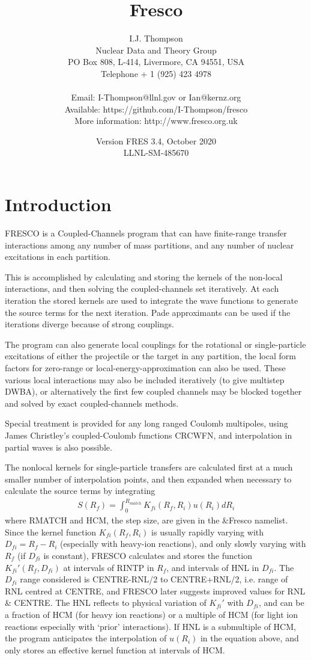 \documentclass[11pt]{article}
\title{\Huge Fresco}
\date{Version FRES 3.4, October 2020\\  LLNL-SM-485670}
\author{I.J. Thompson
%
\\Nuclear Data and Theory Group
\\PO Box 808, L-414,
 Livermore, CA 94551, USA
\\Telephone + 1 (925) 423 4978
\\ %
\\Email: I-Thompson@llnl.gov or Ian@kernz.org
\\Available: https://github.com/I-Thompson/fresco
\\More information: http://www.fresco.org.uk }
\newcommand{\beqn}{\begin{eqnarray}}
\newcommand{\eeqn}{\end{eqnarray}}
\begin{document}
\maketitle
\tableofcontents
\newpage
\section{Introduction}

\parskip 5pt
\parindent 10pt

FRESCO is a Coupled-Channels program that can have finite-range
transfer interactions among any number of mass partitions, and any
number of nuclear excitations in each partition.

This is accomplished by calculating and storing the kernels of the
non-local interactions, and then solving the coupled-channels set
iteratively.
At each iteration the stored kernels are used to integrate the wave
functions to generate the source terms for the next iteration.
Pade approximants can be used if the iterations diverge because of
strong couplings.

The program can also generate local couplings for the rotational
or single-particle excitations of either the projectile or the
target in any partition,
the local form factors for zero-range or local-energy-approximation
can also be used.
These various local interactions may also be included iteratively
(to give multistep DWBA), or alternatively the first few coupled
channels may be blocked together and solved by exact coupled-channels
methods.

Special treatment is provided for any long ranged Coulomb multipoles,
using James Christley's coupled-Coulomb functions CRCWFN,
and interpolation in partial waves is also possible.

The nonlocal kernels for single-particle transfers are calculated first
at a much smaller number of interpolation points,
and then expanded when necessary to calculate the source terms by
integrating
\beqn
S(R _ f ) = \int _ 0 ^ {R _ {match}}
                K _ {fi} (R _ f , R _ i ) u(R _ i ) dR _ i
\eeqn
where RMATCH and HCM, the step size, are given in the \&Fresco namelist.
Since the kernel function $K_{fi}(R_f,R_i)$ is usually rapidly varying with
$D_{fi} = R_{f} - R_{i}$ (especially with heavy-ion reactions), and only slowly
varying with $R_{f}$ (if $D_{fi}$ is constant),  FRESCO calculates and stores
the function $K_{fi}'(R_{f},D_{fi})$ at intervals of RINTP in $R_{f}$,
and intervals of HNL in $D_{fi}$. The $D_{fi}$ range considered is
CENTRE-RNL/2 to CENTRE+RNL/2, i.e. range of RNL centred at CENTRE,
and FRESCO later suggests improved values for RNL \& CENTRE.
The HNL reflects to physical variation of $K_{fi}'$ with $D_{fi}$, and can be
a fraction of HCM (for heavy ion reactions) or a multiple of HCM
(for light ion reactions especially with `prior' interactions).
If HNL is a submultiple of HCM, the program anticipates the interpolation
of $u(R_{i})$ in the equation above, and only stores an effective kernel
function at intervals of HCM.
\end{document}
